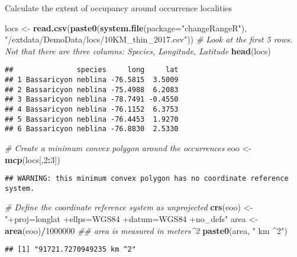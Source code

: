 \documentclass[
]{article}
\newenvironment{Shaded}{\begin{snugshade}}{\end{snugshade}}
\newcommand{\CommentTok}[1]{\textcolor[rgb]{0.56,0.35,0.01}{\textit{#1}}}
\newcommand{\DataTypeTok}[1]{\textcolor[rgb]{0.13,0.29,0.53}{#1}}
\newcommand{\DecValTok}[1]{\textcolor[rgb]{0.00,0.00,0.81}{#1}}
\newcommand{\KeywordTok}[1]{\textcolor[rgb]{0.13,0.29,0.53}{\textbf{#1}}}
\newcommand{\NormalTok}[1]{#1}
\newcommand{\OperatorTok}[1]{\textcolor[rgb]{0.81,0.36,0.00}{\textbf{#1}}}
\newcommand{\StringTok}[1]{\textcolor[rgb]{0.31,0.60,0.02}{#1}}
\begin{document}
Calculate the extent of occupancy around occurrence localities

\begin{Shaded}
\begin{Highlighting}[]
\NormalTok{locs <-}\StringTok{ }\KeywordTok{read.csv}\NormalTok{(}\KeywordTok{paste0}\NormalTok{(}\KeywordTok{system.file}\NormalTok{(}\DataTypeTok{package=}\StringTok{"changeRangeR"}\NormalTok{), }\StringTok{"/extdata/DemoData/locs/10KM_thin_2017.csv"}\NormalTok{))}
\CommentTok{# Look at the first 5 rows. Not that there are three columns: Species, Longitude, Latitude}
\KeywordTok{head}\NormalTok{(locs)}
\end{Highlighting}
\end{Shaded}

\begin{verbatim}
##               species     long     lat
## 1 Bassaricyon neblina -76.5815  3.5009
## 2 Bassaricyon neblina -75.4988  6.2083
## 3 Bassaricyon neblina -78.7491 -0.4550
## 4 Bassaricyon neblina -76.1152  6.3753
## 5 Bassaricyon neblina -76.4453  1.9270
## 6 Bassaricyon neblina -76.8830  2.5330
\end{verbatim}

\begin{Shaded}
\begin{Highlighting}[]
\CommentTok{# Create a minimum convex polygon around the occurrences}
\NormalTok{eoo <-}\StringTok{ }\KeywordTok{mcp}\NormalTok{(locs[,}\DecValTok{2}\OperatorTok{:}\DecValTok{3}\NormalTok{])}
\end{Highlighting}
\end{Shaded}

\begin{verbatim}
## WARNING: this minimum convex polygon has no coordinate reference system.
\end{verbatim}

\begin{Shaded}
\begin{Highlighting}[]
\CommentTok{# Define the coordinate reference system as unprojected}
\KeywordTok{crs}\NormalTok{(eoo) <-}\StringTok{ "+proj=longlat +ellps=WGS84 +datum=WGS84 +no_defs"}
\NormalTok{area <-}\StringTok{ }\KeywordTok{area}\NormalTok{(eoo)}\OperatorTok{/}\DecValTok{1000000}
\CommentTok{## area is measured in meters^2}
\KeywordTok{paste0}\NormalTok{(area, }\StringTok{" km ^2"}\NormalTok{)}
\end{Highlighting}
\end{Shaded}

\begin{verbatim}
## [1] "91721.7270949235 km ^2"
\end{verbatim}
\end{document}
